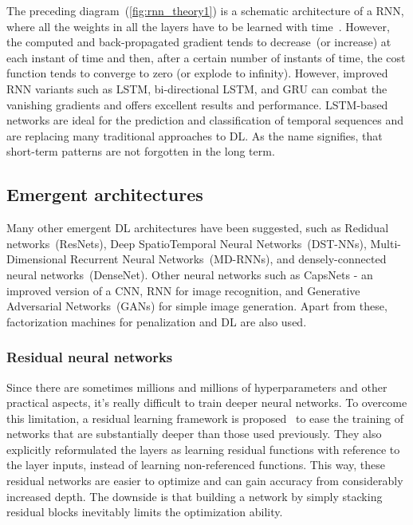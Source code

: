\hspace*{3.5mm} The preceding diagram~(\cref{fig:rnn_theory1}) is a schematic architecture of a RNN, where all the weights in all the layers have to be learned with time~\cite{karimDLTF2018}. However, the computed and back-propagated gradient tends to decrease~(or increase) at each instant of time and then, after a certain number of instants of time, the cost function tends to converge to zero (or explode to infinity). However, improved RNN variants such as LSTM, bi-directional LSTM, and GRU can combat the vanishing gradients and offers excellent results and performance. LSTM-based networks are ideal for the prediction and classification of temporal sequences and are replacing many traditional approaches to DL. As the name signifies, that short-term patterns are not forgotten in the long term. 

\subsection{Emergent architectures}
Many other emergent DL architectures have been suggested, such as Redidual networks~(ResNets), Deep SpatioTemporal Neural Networks~(DST-NNs), Multi-Dimensional Recurrent Neural Networks~(MD-RNNs), and densely-connected neural networks~(DenseNet). Other neural networks such as CapsNets - an improved version of a CNN, RNN for image recognition, and Generative Adversarial Networks~(GANs) for simple image generation. Apart from these, factorization machines for penalization and DL are also used. 

\iffalse
\subsubsection{Residual neural networks}
Since there are sometimes millions and millions of hyperparameters and other practical aspects, it's really difficult to train deeper neural networks. To overcome this limitation, a residual learning framework is proposed~\cite{zagoruyko2016wide} to ease the training of networks that are substantially deeper than those used previously. They also explicitly reformulated the layers as learning residual functions with reference to the layer inputs, instead of learning non-referenced functions. This way, these residual networks are easier to optimize and can gain accuracy from considerably increased depth. The downside is that building a network by simply stacking residual blocks inevitably limits the optimization ability. %

